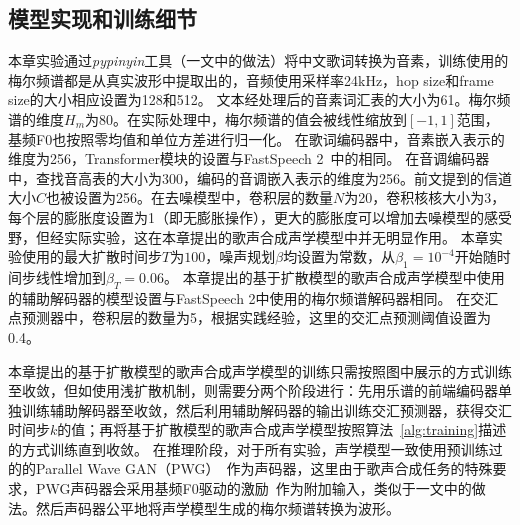 \subsection{模型实现和训练细节}
\label{sec:svs_inference}
本章实验通过\textit{pypinyin}工具（\citet{ren2020deepsinger}一文中的做法）将中文歌词转换为音素，训练使用的梅尔频谱都是从真实波形中提取出的，音频使用采样率24kHz，hop size和frame size的大小相应设置为128和512。
文本经处理后的音素词汇表的大小为61。梅尔频谱的维度$H_m$为80。在实际处理中，梅尔频谱的值会被线性缩放到$[-1,1]$范围，基频F0也按照零均值和单位方差进行归一化。
在歌词编码器中，音素嵌入表示的维度为256，Transformer模块的设置与FastSpeech 2~\citep{ren2021fastspeech}中的相同。
在音调编码器中，查找音高表的大小为300，编码的音调嵌入表示的维度为256。前文提到的信道大小$C$也被设置为256。在去噪模型中，卷积层的数量$N$为20，卷积核核大小为3，每个层的膨胀度设置为1（即无膨胀操作），更大的膨胀度可以增加去噪模型的感受野，但经实际实验，这在本章提出的歌声合成声学模型中并无明显作用。
本章实验使用的最大扩散时间步$T$为$100$，噪声规划$\beta$均设置为常数，从$\beta_1=10^{-4}$开始随时间步线性增加到$\beta_T=0.06$。
本章提出的基于扩散模型的歌声合成声学模型中使用的辅助解码器的模型设置与FastSpeech 2中使用的梅尔频谱解码器相同。
在交汇点预测器中，卷积层的数量为5，根据实践经验，这里的交汇点预测阈值设置为0.4。

本章提出的基于扩散模型的歌声合成声学模型的训练只需按照图\label{fig:main_fig_sub1}中展示的方式训练至收敛，但如使用浅扩散机制，则需要分两个阶段进行：先用乐谱的前端编码器单独训练辅助解码器至收敛，然后利用辅助解码器的输出训练交汇预测器，获得交汇时间步$k$的值；再将基于扩散模型的歌声合成声学模型按照算法~\ref{alg:training}描述的方式训练直到收敛。
在推理阶段，对于所有实验，声学模型一致使用预训练过的的Parallel Wave GAN（PWG）~\citep{yamamoto2020parallel}作为声码器，这里由于歌声合成任务的特殊要求，PWG声码器会采用基频F0驱动的激励~\citep{wang2020using}作为附加输入，类似于\citet{chen2020hifisinger}一文中的做法。然后声码器公平地将声学模型生成的梅尔频谱转换为波形。
